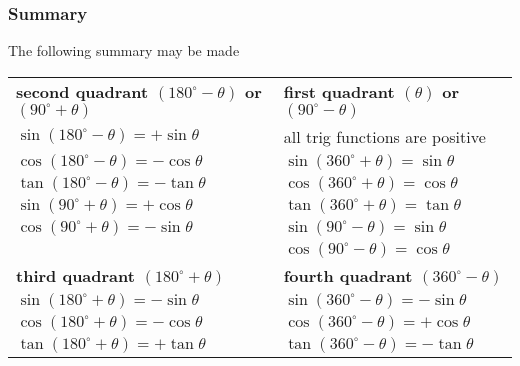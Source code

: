 \subsubsection{Summary}
The following summary may be made

\begin{center}
\begin{tabular}{l|l}
\textbf{second quadrant $(180^\circ-\theta)$ or $(90^\circ+\theta)$}& \textbf{first quadrant $(\theta)$ or $(90^\circ-\theta)$}\\
 $\sin(180^\circ-\theta) = +\sin\theta$ & all trig functions are positive \\
 $\cos(180^\circ-\theta) = -\cos\theta$ & $\sin(360^\circ+\theta) = \sin\theta$ \\
 $\tan(180^\circ-\theta) = -\tan\theta$ & $\cos(360^\circ+\theta) = \cos\theta$ \\
 $\sin(90^\circ+\theta) = +\cos\theta$	& $\tan(360^\circ+\theta) = \tan\theta$\\
 $\cos(90^\circ+\theta) = -\sin\theta$ &$\sin(90^\circ-\theta) = \sin\theta$ \\
 & $\cos(90^\circ-\theta) = \cos\theta$ \\
\hline
\textbf{third quadrant $(180^\circ+\theta)$} & \textbf{fourth quadrant $(360^\circ-\theta)$} \\
 $\sin(180^\circ+\theta) = -\sin\theta$ & $\sin(360^\circ-\theta) = -\sin\theta$ \\
 $\cos(180^\circ+\theta) = -\cos\theta$ & $\cos(360^\circ-\theta) = +\cos\theta$ \\
 $\tan(180^\circ+\theta) = +\tan\theta$ & $\tan(360^\circ-\theta) = -\tan\theta$\\
\end{tabular}
\end{center}


